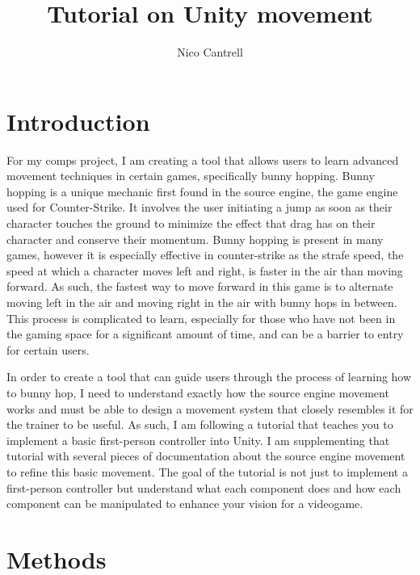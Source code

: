 \documentclass[10pt,twocolumn]{article}
\title{Tutorial on Unity movement}
\author{Nico Cantrell}
\affiliation{Occidental College}
\begin{document}
\maketitle
\section{Introduction}

For my comps project, I am creating a tool that allows users to learn advanced movement techniques
in certain games, specifically bunny hopping. Bunny hopping is a unique mechanic first found in the source engine, the game engine used for Counter-Strike. It involves the user initiating a jump as
soon as their character touches the ground to minimize the effect that drag has on their character and conserve their momentum. Bunny hopping is present in many games, however it is especially effective in counter-strike as the strafe speed, the speed at which a character moves left and right, is faster in the air than moving forward. As such, the fastest way to move forward in this game is to alternate moving left in the air and moving right in the air with bunny hops in between. This process is complicated to learn, especially for those who have not been in the gaming space for a significant amount of time, and can be a barrier to entry for certain users.

In order to create a tool that can guide users through the process of learning how to bunny hop, I need to understand exactly how the source engine movement works and must be able to design a movement system that closely resembles it for the trainer to be useful. As such, I am following a tutorial that teaches you to implement a basic first-person controller into Unity. I am supplementing that tutorial with several pieces of documentation about the source engine movement to refine this basic movement. The goal of the tutorial is not just to implement a first-person controller but understand what each component does and how each component can be manipulated to enhance your vision for a videogame.

\section{Methods}
\end{document}

